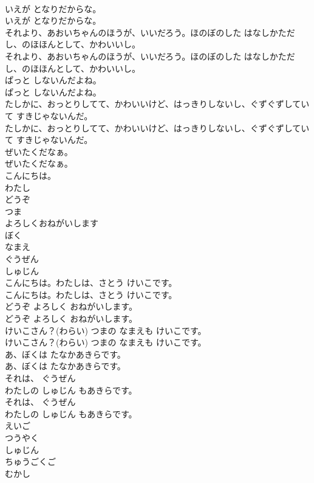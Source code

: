 \documentclass[8pt]{extreport}
\begin{document}
\begin{CJK}{UTF8}{min}
\\	いえが となりだからな。
\\	いえが となりだからな。
\\	それより、あおいちゃんのほうが、いいだろう。ほのぼのした はなしかただし、のほほんとして、かわいいし。
\\	それより、あおいちゃんのほうが、いいだろう。ほのぼのした はなしかただし、のほほんとして、かわいいし。
\\	ぱっと しないんだよね。
\\	ぱっと しないんだよね。
\\	たしかに、おっとりしてて、かわいいけど、はっきりしないし、ぐずぐずしていて すきじゃないんだ。
\\	たしかに、おっとりしてて、かわいいけど、はっきりしないし、ぐずぐずしていて すきじゃないんだ。
\\	ぜいたくだなぁ。
\\	ぜいたくだなぁ。
\\	こんにちは。
\\	わたし
\\	どうぞ
\\	つま
\\	よろしくおねがいします
\\	ぼく
\\	なまえ
\\	ぐうぜん
\\	しゅじん
\\	こんにちは。わたしは、さとう けいこです。
\\	こんにちは。わたしは、さとう けいこです。
\\	どうぞ よろしく おねがいします。
\\	どうぞ よろしく おねがいします。
\\	けいこさん？(わらい) つまの なまえも けいこです。
\\	けいこさん？(わらい) つまの なまえも けいこです。
\\	あ、ぼくは たなかあきらです。
\\	あ、ぼくは たなかあきらです。
\\	それは、 ぐうぜん
\\	わたしの しゅじん もあきらです。
\\	それは、 ぐうぜん
\\	わたしの しゅじん もあきらです。
\\	えいご
\\	つうやく
\\	しゅじん
\\	ちゅうごくご
\\	むかし

\end{CJK}
\end{document}
